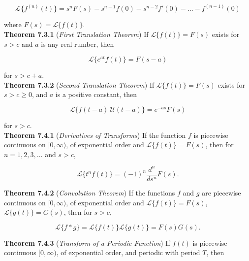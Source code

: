 \documentclass[12pt]{article}
\begin{document}
\begin{equation}
    \mathcal{L} \{f^{(n)}(t)\} = s^n F(s) - s^{n-1} f(0) - s^{n-2} f'(0) - \ldots - f^{(n-1)}(0)
\end{equation}

\noindent where \(F(s) = \mathcal{L} \{f(t)\}\).\\

\noindent\textbf{Theorem 7.3.1} (\emph{First Translation Theorem}) If \(\mathcal{L} \{f(t)\} = F(s)\) exists for \(s > c\) and \(a\) is any real rumber, then

\begin{equation}
    \mathcal{L} \{e^{at} f(t)\} = F(s-a)
\end{equation}

\noindent for \(s > c + a\).\\

\noindent\textbf{Theorem 7.3.2} (\emph{Second Translation Theorem}) If \(\mathcal{L} \{f(t)\} = F(s)\) exists for \(s > c \geq 0\), and \(a\) is a positive constant, then

\begin{equation}
    \mathcal{L} \{f(t-a)\ \mathcal{U}(t-a)\} = e^{-as}F(s)
\end{equation}

\noindent for \(s > c\).\\

\noindent\textbf{Theorem 7.4.1} (\emph{Derivatives of Transforms}) If the function \(f\) is piecewise continuous on \([0,\infty)\), of exponential order and \(\mathcal{L} \{f(t)\} = F(s)\), then for \(n = 1, 2, 3, \ldots\) and \(s > c\),

\begin{equation}
    \mathcal{L} \{t^n f(t)\} = (-1)^n\frac{d^n}{ds^n} F(s).
\end{equation}

\noindent\textbf{Theorem 7.4.2} (\emph{Convolution Theorem}) If the functions \(f\) and \(g\) are piecewise continuous on \([0,\infty)\), of exponential order and \(\mathcal{L} \{f(t)\} = F(s)\), \(\mathcal{L} \{g(t)\} = G(s)\), then for \(s > c\),

\begin{equation}
    \mathcal{L} \{f*g\} = \mathcal{L} \{f(t)\} \mathcal{L} \{g(t)\} = F(s)G(s).
\end{equation}

\noindent\textbf{Theorem 7.4.3} (\emph{Transform of a Periodic Function}) If \(f(t)\) is piecewise continuous \([0,\infty)\), of exponential order, and periodic with period \(T\), then
\end{document}
